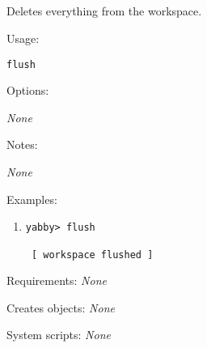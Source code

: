 
\subsection[flush]{  }



Deletes everything from the workspace.


\begin{description}


\item{Usage:}

{\tt flush}


\item{Options:}
\begin{description}
{\em None}
\end{description}


\item{Notes:}
\begin{enumerate}
{\em None}
\end{enumerate}


\item{Examples:}
\begin{enumerate}

\item
\begin{verbatim}
yabby> flush

 [ workspace flushed ]
\end{verbatim}

\end{enumerate}


\item{Requirements:} {\em None}


\item{Creates objects:} {\em None}


\item{System scripts:} {\em None}

\end{description}

